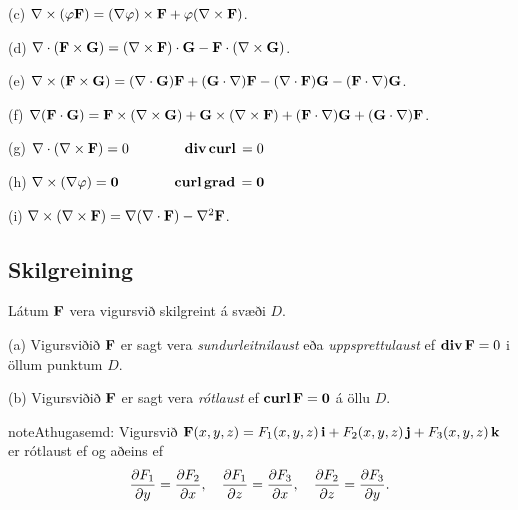 \documentclass[a4paper,10pt,icelandic]{sphinxmanual}
\begin{document}
(c)
\(\nabla\times(\varphi\mbox{${\bf F}$})=(\nabla\varphi)\times\mbox{${\bf F}$}+\varphi(\nabla\times\mbox{${\bf F}$})\).

(d)
\(\nabla\cdot(\mbox{${\bf F}$}\times\mbox{${\bf G}$})=(\nabla\times\mbox{${\bf F}$})\cdot\mbox{${\bf G}$}-\mbox{${\bf F}$}\cdot(\nabla\times\mbox{${\bf G}$})\).

(e)
\(\nabla\times(\mbox{${\bf F}$}\times\mbox{${\bf G}$})=(\nabla\cdot\mbox{${\bf G}$})\mbox{${\bf F}$}+(\mbox{${\bf G}$}\cdot\nabla)\mbox{${\bf F}$}-(\nabla\cdot\mbox{${\bf F}$})\mbox{${\bf G}$}-(\mbox{${\bf F}$}\cdot\nabla)\mbox{${\bf G}$}\).

(f)
\(\nabla(\mbox{${\bf F}$}\cdot\mbox{${\bf G}$})=\mbox{${\bf F}$}\times(\nabla\times \mbox{${\bf G}$})+\mbox{${\bf G}$}\times(\nabla\times \mbox{${\bf F}$})+(\mbox{${\bf F}$}\cdot\nabla)\mbox{${\bf G}$}+(\mbox{${\bf G}$}\cdot\nabla)\mbox{${\bf F}$}\).

(g)
\(\nabla\cdot(\nabla\times \mbox{${\bf F}$})=0\qquad\qquad\mbox{${\rm\bf div\,}$}\mbox{${\rm\bf curl\,}$}=0\)

(h)
\(\nabla\times(\nabla\varphi)=\mbox{${\bf 0}$}\qquad\qquad\mbox{${\rm\bf curl\,}$}\mbox{${\rm\bf grad\,}$}=\mbox{${\bf 0}$}\)

(i)
\(\nabla\times(\nabla\times \mbox{${\bf F}$})=\nabla(\nabla\cdot\mbox{${\bf F}$})-\nabla^2\mbox{${\bf F}$}\).


\subsection{Skilgreining}
\label{Kafli6:id3}\label{Kafli6:index-0}
Látum \(\mbox{${\bf F}$}\) vera vigursvið skilgreint á svæði
\(D\).

(a) Vigursviðið \(\mbox{${\bf F}$}\) er sagt vera
\textit{sundurleitnilaust} eða \emph{uppsprettulaust} ef
\(\mbox{${\rm\bf div\,}$}\mbox{${\bf F}$}=0\) i öllum punktum
\(D\).

(b) Vigursviðið \(\mbox{${\bf F}$}\) er sagt vera \textit{rótlaust}
ef \(\mbox{${\rm\bf curl\,}$}\mbox{${\bf F}$}=\mbox{${\bf 0}$}\) á öllu
\(D\).

\begin{notice}{note}{Athugasemd:}
Vigursvið \(\mbox{${\bf F}$}(x,y,z)=F_1(x,y,z)\,\mbox{${\bf i}$}+F_2(x,y,z)\,\mbox{${\bf j}$}+F_3(x,y,z)\,\mbox{${\bf k}$}\) er rótlaust ef og aðeins ef
\begin{gather}
\begin{split}\displaystyle
\frac{\partial F_1}{\partial y}=
\frac{\partial F_2}{\partial x},\quad
\frac{\partial F_1}{\partial z}=
\frac{\partial F_3}{\partial x},\quad
\frac{\partial F_2}{\partial z}=
\frac{\partial F_3}{\partial y}.\end{split}\notag
\end{gather}\end{notice}
\end{document}
